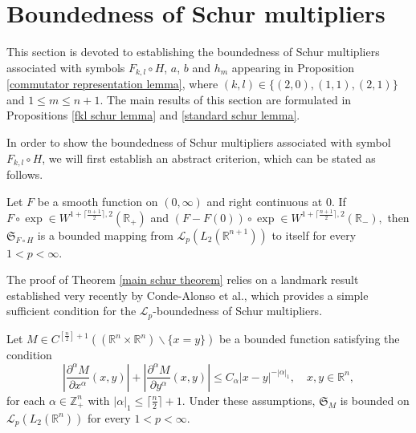 \documentclass[12pt]{amsart}
\begin{document}
\section{Boundedness of Schur multipliers}\label{Sec4}
\setcounter{equation}{0}

This section is devoted to establishing the boundedness of Schur multipliers associated with symbols $F_{k,l}\circ H$, $a$, $b$ and $h_m$ appearing in Proposition \ref{commutator representation lemma},  where $(k,l)\in\{(2,0),(1,1),(2,1)\}$ and $1\leq m\leq n+1$. The main results of this section are formulated in Propositions \ref{fkl schur lemma} and \ref{standard schur lemma}.


In order to show the boundedness of Schur multipliers associated with symbol $F_{k,l}\circ H$, we will first establish an abstract criterion, which can be stated as follows.
\begin{theorem}\label{main schur theorem} Let $F$ be a smooth function on $(0,\infty)$ and right continuous at $0.$ If $F\circ\exp\in W^{1+\lceil\frac{n+1}{2}\rceil,2}(\mathbb{R}_+)$ and $(F-F(0))\circ\exp\in W^{1+\lceil\frac{n+1}{2}\rceil,2}(\mathbb{R}_-),$ then $\mathfrak{S}_{F\circ H}$ is a bounded mapping from $\mathcal{L}_p(L_2(\mathbb{R}^{n+1}))$ to itself for every $1<p<\infty.$
\end{theorem}

The proof of Theorem \ref{main schur theorem} relies on a landmark result established very recently by Conde-Alonso {\color{blue}et al.,} which provides a simple sufficient condition for the $\mathcal{L}_p$-boundedness of Schur multipliers.
\begin{theorem}\cite[Theorem A]{MR4660138}\label{Annalspaper}
Let $M\in C^{[\frac{n}{2}]+1}((\mathbb{R}^n\times\mathbb{R}^n)\backslash\{x=y\})$ be a bounded function satisfying the condition
$$\left|\frac{\partial^\alpha M}{\partial x^\alpha}(x,y)\right|+\left|\frac{\partial^\alpha M}{\partial y^\alpha}(x,y)\right|\leq C_\alpha |x-y|^{-|\alpha|_1},\quad x,y\in\mathbb{R}^n,$$
for each $\alpha\in\mathbb{Z}_+^n$ with $|\alpha|_1\leq \lceil\frac{n}{2}\rceil+1.$ Under these assumptions, $\mathfrak{S}_M$ is bounded on $\mathcal{L}_p(L_2(\mathbb{R}^n))$ for every $1<p<\infty.$
\end{theorem}
\end{document}
